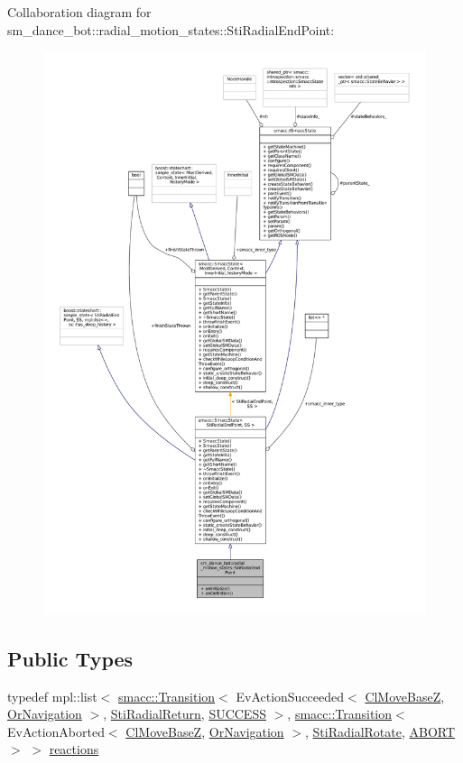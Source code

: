 Collaboration diagram for sm\+\_\+dance\+\_\+bot\+:\+:radial\+\_\+motion\+\_\+states\+:\+:Sti\+Radial\+End\+Point\+:
\nopagebreak
\begin{figure}[H]
\begin{center}
\leavevmode
\includegraphics[width=350pt]{structsm__dance__bot_1_1radial__motion__states_1_1StiRadialEndPoint__coll__graph}
\end{center}
\end{figure}
\subsection*{Public Types}
\begin{DoxyCompactItemize}
\item 
typedef mpl\+::list$<$ \hyperlink{classsmacc_1_1Transition}{smacc\+::\+Transition}$<$ Ev\+Action\+Succeeded$<$ \hyperlink{classmove__base__z__client_1_1ClMoveBaseZ}{Cl\+Move\+BaseZ}, \hyperlink{classsm__dance__bot_1_1OrNavigation}{Or\+Navigation} $>$, \hyperlink{structsm__dance__bot_1_1radial__motion__states_1_1StiRadialReturn}{Sti\+Radial\+Return}, \hyperlink{classSUCCESS}{S\+U\+C\+C\+E\+SS} $>$, \hyperlink{classsmacc_1_1Transition}{smacc\+::\+Transition}$<$ Ev\+Action\+Aborted$<$ \hyperlink{classmove__base__z__client_1_1ClMoveBaseZ}{Cl\+Move\+BaseZ}, \hyperlink{classsm__dance__bot_1_1OrNavigation}{Or\+Navigation} $>$, \hyperlink{structsm__dance__bot_1_1radial__motion__states_1_1StiRadialRotate}{Sti\+Radial\+Rotate}, \hyperlink{classABORT}{A\+B\+O\+RT} $>$ $>$ \hyperlink{structsm__dance__bot_1_1radial__motion__states_1_1StiRadialEndPoint_a4c90a71c9d5bc8b4f96cf74834b71abd}{reactions}
\end{DoxyCompactItemize}
